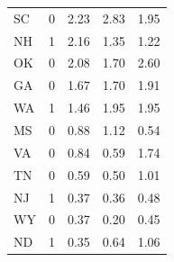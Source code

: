 \begin{table}[ht]
\begin{tabular}{lrrrr}
  SC & 0 & 2.23 & 2.83 & 1.95 \\ 
  NH & 1 & 2.16 & 1.35 & 1.22 \\ 
  OK & 0 & 2.08 & 1.70 & 2.60 \\ 
  GA & 0 & 1.67 & 1.70 & 1.91 \\ 
  WA & 1 & 1.46 & 1.95 & 1.95 \\ 
  MS & 0 & 0.88 & 1.12 & 0.54 \\ 
  VA & 0 & 0.84 & 0.59 & 1.74 \\ 
  TN & 0 & 0.59 & 0.50 & 1.01 \\ 
  NJ & 1 & 0.37 & 0.36 & 0.48 \\ 
  WY & 0 & 0.37 & 0.20 & 0.45 \\ 
  ND & 1 & 0.35 & 0.64 & 1.06 \\ 
   \hline
\end{tabular}
\end{table}

